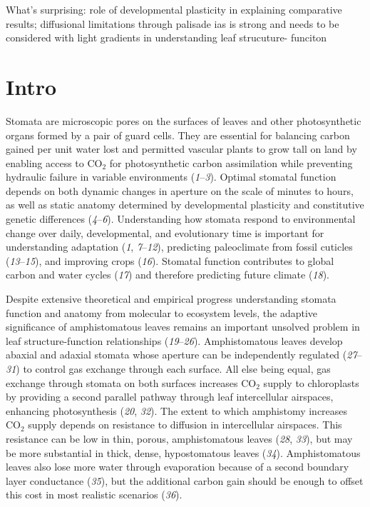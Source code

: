 \documentclass[
  letterpaper,
  DIV=11,
  numbers=noendperiod]{scrartcl}
\begin{document}
What's surprising: role of developmental plasticity in explaining
comparative results; diffusional limitations through palisade ias is
strong and needs to be considered with light gradients in understanding
leaf strucuture- funciton

\section{Intro}\label{intro}

Stomata are microscopic pores on the surfaces of leaves and other
photosynthetic organs formed by a pair of guard cells. They are
essential for balancing carbon gained per unit water lost and permitted
vascular plants to grow tall on land by enabling access to CO\(_2\) for
photosynthetic carbon assimilation while preventing hydraulic failure in
variable environments (\emph{1}--\emph{3}). Optimal stomatal function
depends on both dynamic changes in aperture on the scale of minutes to
hours, as well as static anatomy determined by developmental plasticity
and constitutive genetic differences (\emph{4}--\emph{6}). Understanding
how stomata respond to environmental change over daily, developmental,
and evolutionary time is important for understanding adaptation
(\emph{1}, \emph{7}--\emph{12}), predicting paleoclimate from fossil
cuticles (\emph{13}--\emph{15}), and improving crops (\emph{16}).
Stomatal function contributes to global carbon and water cycles
(\emph{17}) and therefore predicting future climate (\emph{18}).

Despite extensive theoretical and empirical progress understanding
stomata function and anatomy from molecular to ecosystem levels, the
adaptive significance of amphistomatous leaves remains an important
unsolved problem in leaf structure-function relationships
(\emph{19}--\emph{26}). Amphistomatous leaves develop abaxial and
adaxial stomata whose aperture can be independently regulated
(\emph{27}--\emph{31}) to control gas exchange through each surface. All
else being equal, gas exchange through stomata on both surfaces
increases CO\(_2\) supply to chloroplasts by providing a second parallel
pathway through leaf intercellular airspaces, enhancing photosynthesis
(\emph{20}, \emph{32}). The extent to which amphistomy increases
CO\(_2\) supply depends on resistance to diffusion in intercellular
airspaces. This resistance can be low in thin, porous, amphistomatous
leaves (\emph{28}, \emph{33}), but may be more substantial in thick,
dense, hypostomatous leaves (\emph{34}). Amphistomatous leaves also lose
more water through evaporation because of a second boundary layer
conductance (\emph{35}), but the additional carbon gain should be enough
to offset this cost in most realistic scenarios (\emph{36}).
\end{document}
